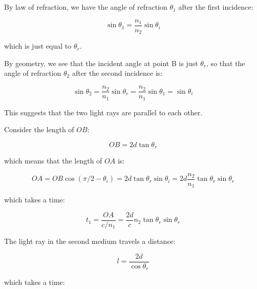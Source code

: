 \documentclass[12pt]{article}
\begin{document}



\pagebreak
\section*{}



By law of refraction, we have the angle of refraction $\theta_1$ after the first incidence:

\begin{equation}
    \sin{\theta_{1}} = \frac{n_{1}}{n_{2}}\sin{\theta_{i}}
\end{equation}

which is just equal to $\theta_{r}$.

By geometry, we see that the incident angle at point B is just $\theta_{r}$, so that the angle of refraction $\theta_{2}$ after the second incidence is:

\begin{equation}
    \sin{\theta_{2}} = \frac{n_{2}}{n_{1}}\sin{\theta_{r}} = \frac{n_{2}}{n_{1}}\sin{\theta_{1}}  = \sin{\theta_{i}}
\end{equation}

This suggests that the two light rays are parallel to each other.

Consider the length of $OB$:

\begin{equation}
    OB = 2d\tan{\theta_{r}}
\end{equation}

which means that the length of $OA$ is:

\begin{equation}
    OA = OB\cos{(\pi/2 - \theta_{i})} = 2d\tan{\theta_{r}}\sin{\theta_{i}} = 2d\frac{n_{2}}{n_{1}} \tan{\theta_{r}} \sin{\theta_{r}}
\end{equation}

which takes a time:

\begin{equation}
    t_{1} = \frac{OA}{c/n_{1}} = \frac{2d}{c} n_{2} \tan{\theta_{r}} \sin{\theta_{r}}
\end{equation}

The light ray in the second medium travels a distance:

\begin{equation}
    l = \frac{2d}{\cos{\theta_{r}}}
\end{equation}

which takes a time:
\end{document}
